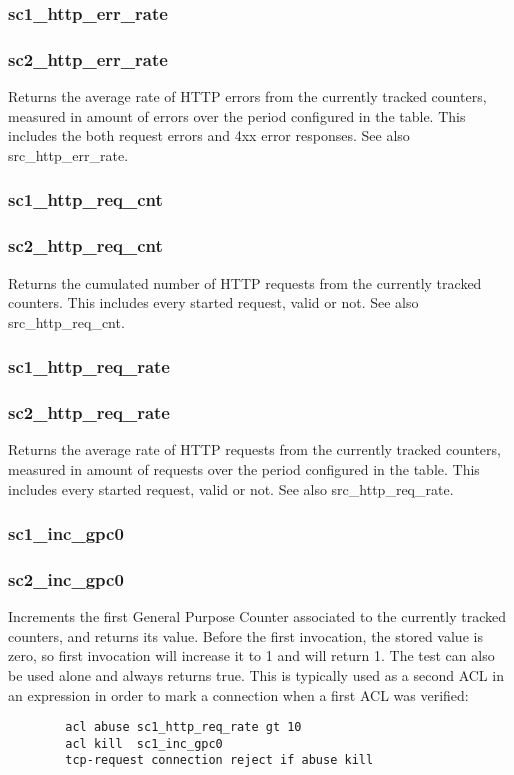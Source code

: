 \subsubsection{sc1\_http\_err\_rate}
\subsubsection{sc2\_http\_err\_rate}
  Returns the average rate of HTTP errors from the currently tracked counters,
  measured in amount of errors over the period configured in the table. This
  includes the both request errors and 4xx error responses. See also
  src\_http\_err\_rate.

\subsubsection{sc1\_http\_req\_cnt}
\subsubsection{sc2\_http\_req\_cnt}
  Returns the cumulated number of HTTP requests from the currently tracked
  counters. This includes every started request, valid or not. See also
  src\_http\_req\_cnt.

\subsubsection{sc1\_http\_req\_rate}
\subsubsection{sc2\_http\_req\_rate}
  Returns the average rate of HTTP requests from the currently tracked
  counters, measured in amount of requests over the period configured in
  the table. This includes every started request, valid or not. See also
  src\_http\_req\_rate.

\subsubsection{sc1\_inc\_gpc0}
\subsubsection{sc2\_inc\_gpc0}
  Increments the first General Purpose Counter associated to the currently
  tracked counters, and returns its value. Before the first invocation, the
  stored value is zero, so first invocation will increase it to 1 and will
  return 1. The test can also be used alone and always returns true. This is
  typically used as a second ACL in an expression in order to mark a connection
  when a first ACL was verified:
  \begin{verbatim}
        acl abuse sc1_http_req_rate gt 10
        acl kill  sc1_inc_gpc0
        tcp-request connection reject if abuse kill
  \end{verbatim}

